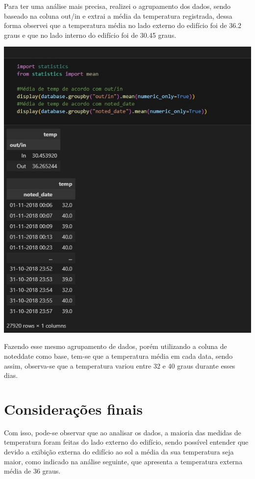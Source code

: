 \documentclass[a4paper, 12pt]{article}
\begin{document}
Para ter uma análise mais precisa, realizei o agrupamento dos dados, sendo baseado na coluna out/in e extrai a média da temperatura registrada, dessa forma observei que a temperatura média no lado externo do edifício foi de 36.2 graus e que no lado interno do edifício foi de 30.45 graus.

\includegraphics[scale=0.6]{img 07.jpg}

Fazendo esse mesmo agrupamento de dados, porém utilizando a coluna de noteddate como base, tem-se que a temperatura média em cada data, sendo assim, observa-se que a temperatura variou entre 32 e 40 graus durante esses dias.



\newpage
\section{Considerações finais}
Com isso, pode-se observar que ao analisar os dados, a maioria das medidas de temperatura foram feitas do lado externo do edifício, sendo possível entender que devido a exibição externa do edifício ao sol a média da sua temperatura seja maior, como indicado na análise seguinte, que apresenta a temperatura externa média de 36 graus.
\end{document}
